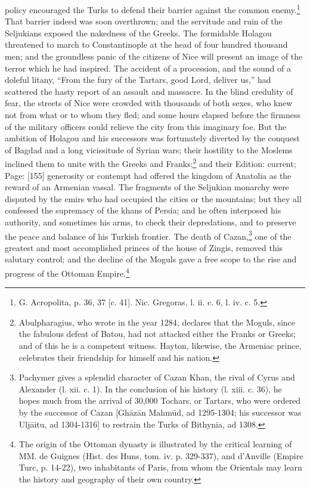 policy encouraged the Turks to defend their barrier against the common enemy.\footnote{G. Acropolita, p. 36, 37 [c. 41]. Nic. Gregoras, l. ii. c. 6, l. iv. c. 5.} That barrier indeed was soon overthrown; and the servitude and ruin of the Seljukians exposed the nakedness of the Greeks. The formidable Holagou threatened to march to Constantinople at the head of four hundred thousand men; and the groundless panic of the citizens of Nice will present an image of the terror which he had inspired. The accident of a procession, and the sound of a doleful litany, \texthebrew{“}From the fury of the Tartars, good Lord, deliver us,\texthebrew{}” had scattered the hasty report of an assault and massacre. In the blind credulity of fear, the streets of Nice were crowded with thousands of both sexes, who knew not from what or to whom they fled; and some hours elapsed before the firmness of the military officers could relieve the city from this imaginary foe. But the ambition of Holagou and his successors was fortunately diverted by the conquest of Bagdad and a long vicissitude of Syrian wars; their hostility to the Moslems inclined them to unite with the Greeks and Franks;\footnote{Abulpharagius, who wrote in the year 1284, declares that the Moguls, since the fabulous defeat of Batou, had not attacked either the Franks or Greeks; and of this he is a competent witness. Hayton, likewise, the Armeniac prince, celebrates their friendship for himself and his nation.} and their Edition: current; Page: [155] generosity or contempt had offered the kingdom of Anatolia as the reward of an Armenian vassal. The fragments of the Seljukian monarchy were disputed by the emirs who had occupied the cities or the mountains; but they all confessed the supremacy of the khans of Persia; and he often interposed his authority, and sometimes his arms, to check their depredations, and to preserve the peace and balance of his Turkish frontier. The death of Cazan,\footnote{Pachymer gives a splendid character of Cazan Khan, the rival of Cyrus and Alexander (l. xii. c. 1). In the conclusion of his history (l. xiii. c. 36), he hopes much from the arrival of 30,000 Tochars, or Tartars, who were ordered by the successor of Cazan [Ghāzān Mahmūd, ad 1295-1304; his successor was Uljāitu, ad 1304-1316] to restrain the Turks of Bithynia, ad 1308.} one of the greatest and most accomplished princes of the house of Zingis, removed this salutary control; and the decline of the Moguls gave a free scope to the rise and progress of the Ottoman Empire.\footnote{The origin of the Ottoman dynasty is illustrated by the critical learning of MM. de Guignes (Hist. des Huns, tom. iv. p. 329-337), and d\texthebrew{}’Anville (Empire Turc, p. 14-22), two inhabitants of Paris, from whom the Orientals may learn the history and geography of their own country.}

